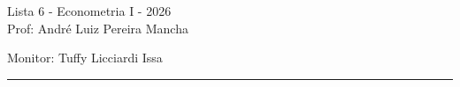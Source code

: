 \documentclass[12pt,letterpaper, onecolumn]{exam}
\begin{document}
\begingroup  
    \centering
    \LARGE Lista 6 - Econometria I - 2026\\[0.5em]
    \large Prof: André Luiz Pereira Mancha \par
    \large Monitor: Tuffy Licciardi Issa  \par
\endgroup
\rule{\textwidth}{0.4pt}
\pointsdroppedatright   %
\printanswers
\renewcommand{\solutiontitle}{\noindent\textbf{Ans:}\enspace}   %
\newcommand{\qstar}{\hspace{-0.6em}\textsuperscript{*}\hspace{0.2em}}
\end{document}
